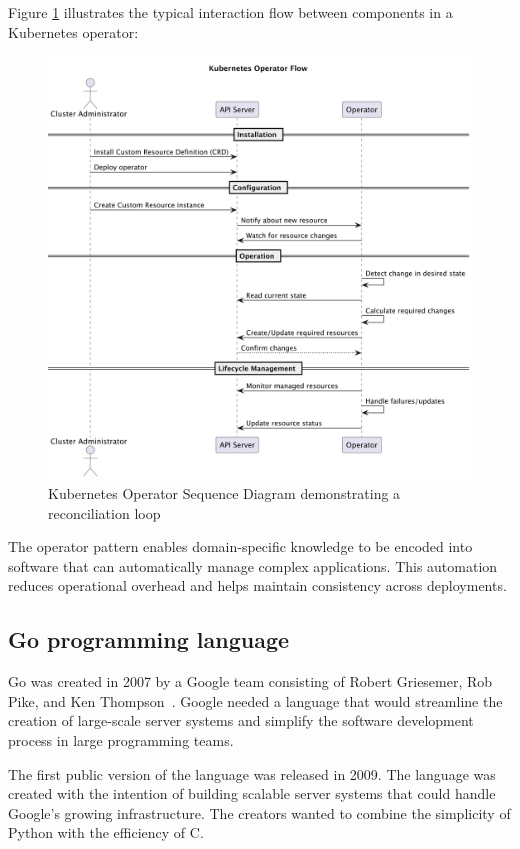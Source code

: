 Figure \ref{fig:kubernetes-operator-flow} illustrates the typical interaction flow between components in a Kubernetes operator:

\begin{figure}[htbp]
    \centering
    \includegraphics[width=\textwidth]{images/kubernetes_operator_flow.png}
    \caption{Kubernetes Operator Sequence Diagram demonstrating a reconciliation loop}
    \label{fig:kubernetes-operator-flow}
\end{figure}

The operator pattern enables domain-specific knowledge to be encoded into software that can automatically manage complex applications.
This automation reduces operational overhead and helps maintain consistency across deployments.

\subsection{Go programming language}

Go was created in 2007 by a Google team consisting of Robert Griesemer, Rob Pike, and Ken Thompson~\cite{golang}.
Google needed a language that would streamline the creation of large-scale server systems and simplify the software development process in large programming teams.

The first public version of the language was released in 2009.
The language was created with the intention of building scalable server systems that could handle Google's growing infrastructure.
The creators wanted to combine the simplicity of Python with the efficiency of C.

